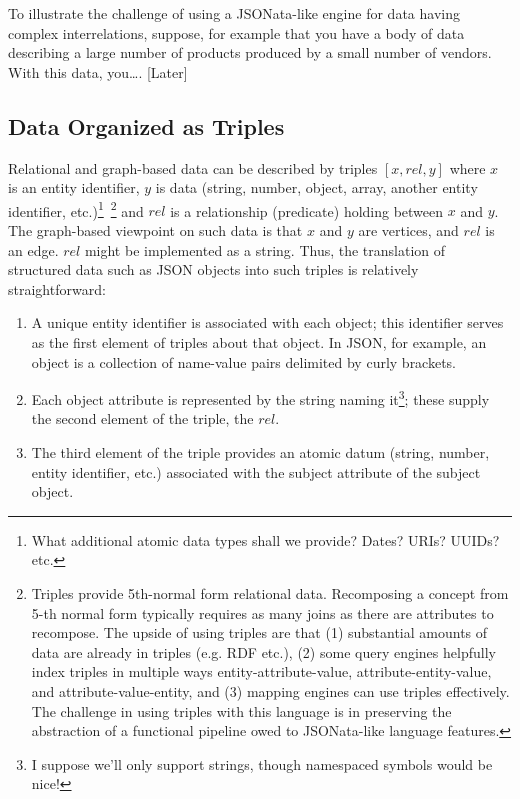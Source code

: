 \documentclass[9pt,letterpaper]{article}
\begin{document}
To illustrate the challenge of using a JSONata-like engine for data having complex interrelations, suppose, for example that you have a body of data describing a large number of products produced by a small number of vendors.
With this data, you\ldots. [Later]

\subsection{Data Organized as Triples}
Relational and graph-based data can be described by triples $[x,rel,y]$ where $x$ is an entity identifier, $y$ is data (string, number, object, array, another entity identifier, etc.)\footnote{What  additional atomic data
  types shall we provide? Dates? URIs? UUIDs? etc.}~\footnote{Triples provide 5th-normal form relational data. Recomposing a concept from 5-th normal form typically requires as many joins as
  there are attributes to recompose.
  The upside of using triples are that
  (1) substantial amounts of data are already in triples (e.g. RDF etc.),
  (2) some query engines helpfully index triples in multiple ways entity-attribute-value, attribute-entity-value, and attribute-value-entity, and
  (3) mapping engines can use triples effectively.
  The challenge in using triples with this language is in preserving the abstraction of a functional pipeline owed to JSONata-like language features.}
and $rel$ is a relationship (predicate) holding between $x$ and $y$.
The graph-based viewpoint on such data is that $x$ and $y$ are vertices, and $rel$ is an edge.
$rel$ might be implemented as a string.
Thus, the translation of structured data such as JSON objects into such triples is relatively straightforward:
\begin{enumerate}
\item A unique entity identifier is associated with each object; this identifier serves as the first element of triples about that object.
      In JSON, for example, an object is a collection of name-value pairs delimited by curly brackets.
\item Each object attribute is represented by the string naming it\footnote{I suppose we'll only support strings, though namespaced symbols would be nice!}; these supply the second element of the triple, the $rel$.
\item The third element of the triple provides an atomic datum (string, number, entity identifier, etc.) associated with the subject attribute of the subject object.
\end{enumerate}
\end{document}
